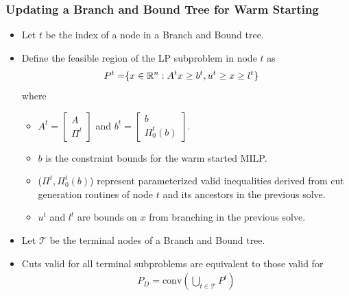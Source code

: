 \documentclass{beamer}
\begin{document}
	\begin{frame}[t]
		\frametitle{Updating a Branch and Bound Tree for Warm Starting}
		\small
		\begin{itemize}
			\item Let $ t $ be the index of a node in a Branch and Bound tree.
			\item Define the feasible region of the LP subproblem in node $ t $ as
			\begin{align*}
				P^{t} =& \{x \in \mathbb{R}^n : A^{t} x \geq b^{t}, u^{t} \geq x \geq l^{t} \}
			\end{align*}
			where
			\begin{itemize}
				\item $ A^{t} = \begin{bmatrix} A \\ \Pi^{t} \end{bmatrix}$ and $ b^{t} = \begin{bmatrix} b \\ \Pi_0^{t}(b) \end{bmatrix} $.
				\item $ b $ is the constraint bounds for the warm started MILP.
				\item ($ \Pi^{t}, \Pi_0^{t}(b) $) represent parameterized valid inequalities derived from cut generation routines of node $ t $ and its ancestors in the previous solve.
				\item $ u^{t} $ and $ l^{t} $ are bounds on $ x $ from branching in the previous solve.
			\end{itemize}
			\item Let $ \mathcal{T} $ be the terminal nodes of a Branch and Bound tree.
			\item Cuts valid for all terminal subproblems are equivalent to those valid for
			\begin{align*}
				P_D = \text{conv}(\underset{t \in \mathcal{T}}{\bigcup} P^{t})
			\end{align*}
		\end{itemize}
		\normalsize
	\end{frame}
\end{document}
